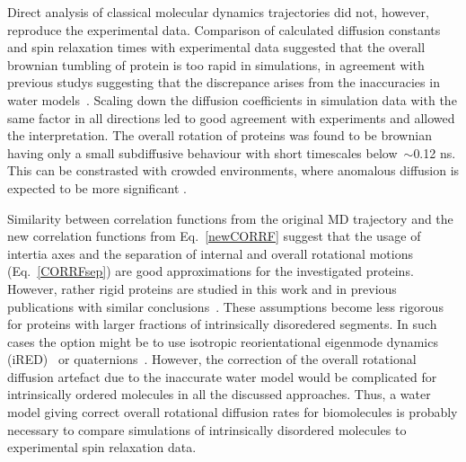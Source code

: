 \documentclass[pre,aps,floatfix,authordate1-4,twocolumn]{revtex4-1}
\begin{document}
Direct analysis of classical molecular dynamics trajectories did not, however,
reproduce the experimental data. Comparison of calculated diffusion constants
and spin relaxation times with experimental data suggested that
the overall brownian tumbling of protein is too rapid in simulations,
in agreement with previous studys suggesting that the discrepance arises
from the inaccuracies in water models~\cite{wong08}.
Scaling down the diffusion coefficients in simulation data
with the same factor in all directions 
led to good agreement with experiments and allowed the interpretation.
The overall rotation of proteins was found to be brownian having
only a small subdiffusive behaviour with short timescales
below~$\sim$0.12 ns. This can be constrasted with crowded environments,
where anomalous diffusion is expected to be more significant \cite{hofling13}.

Similarity between correlation functions from the original MD trajectory and
the new correlation functions from Eq.~\ref{newCORRF} 
suggest that the usage of intertia axes
and the separation of internal and overall rotational motions
(Eq.~\ref{CORRFsep}) are good approximations for the investigated
proteins. However, rather rigid proteins are studied in this
work and in previous publications with similar conclusions~\cite{wong08,allner15}.
These assumptions become less rigorous for proteins with larger
fractions of intrinsically disoredered segments. In such cases the option
might be to use isotropic reorientational eigenmode dynamics (iRED)~\cite{prompers02}
or quaternions~\cite{anderson12}. However, the correction of the overall
rotational diffusion artefact due to the inaccurate water model would be complicated
for intrinsically ordered molecules in all the discussed approaches.
Thus, a water model giving correct
overall rotational diffusion rates for biomolecules is probably necessary
to compare simulations of intrinsically disordered molecules
to experimental spin relaxation data.
\end{document}
